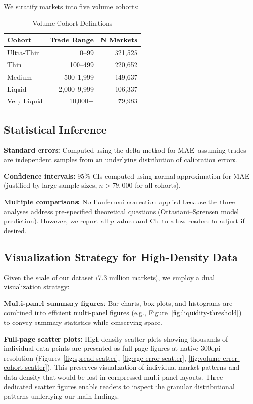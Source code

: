 \documentclass[12pt,letterpaper]{article}
\begin{document}
We stratify markets into five volume cohorts:

\begin{table}[ht]
\centering
\caption{Volume Cohort Definitions}
\label{tab:cohorts}
\begin{tabular}{lrr}
\toprule
\textbf{Cohort} & \textbf{Trade Range} & \textbf{N Markets} \\
\midrule
Ultra-Thin & 0--99 & 321,525 \\
Thin & 100--499 & 220,652 \\
Medium & 500--1,999 & 149,637 \\
Liquid & 2,000--9,999 & 106,337 \\
Very Liquid & 10,000+ & 79,983 \\
\bottomrule
\end{tabular}
\end{table}

\subsection{Statistical Inference}

\textbf{Standard errors:} Computed using the delta method for MAE, assuming trades are independent samples from an underlying distribution of calibration errors.

\textbf{Confidence intervals:} 95\% CIs computed using normal approximation for MAE (justified by large sample sizes, $n > 79,000$ for all cohorts).

\textbf{Multiple comparisons:} No Bonferroni correction applied because the three analyses address pre-specified theoretical questions (Ottaviani--S{\o}rensen model prediction). However, we report all $p$-values and CIs to allow readers to adjust if desired.

\subsection{Visualization Strategy for High-Density Data}

Given the scale of our dataset (7.3 million markets), we employ a dual visualization strategy:

\textbf{Multi-panel summary figures:} Bar charts, box plots, and histograms are combined into efficient multi-panel figures (e.g., Figure~\ref{fig:liquidity-threshold}) to convey summary statistics while conserving space.

\textbf{Full-page scatter plots:} High-density scatter plots showing thousands of individual data points are presented as full-page figures at native 300dpi resolution (Figures~\ref{fig:spread-scatter}, \ref{fig:age-error-scatter}, \ref{fig:volume-error-cohort-scatter}). This preserves visualization of individual market patterns and data density that would be lost in compressed multi-panel layouts. Three dedicated scatter figures enable readers to inspect the granular distributional patterns underlying our main findings.
\end{document}
